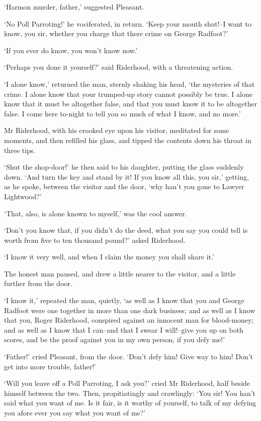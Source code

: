 ‘Harmon murder, father,’ suggested Pleasant.

‘No Poll Parroting!’ he vociferated, in return. ‘Keep your mouth
shut!--I want to know, you sir, whether you charge that there crime on
George Radfoot?’

‘If you ever do know, you won’t know now.’

‘Perhaps you done it yourself?’ said Riderhood, with a threatening
action.

‘I alone know,’ returned the man, sternly shaking his head, ‘the
mysteries of that crime. I alone know that your trumped-up story cannot
possibly be true. I alone know that it must be altogether false, and
that you must know it to be altogether false. I come here to-night to
tell you so much of what I know, and no more.’

Mr Riderhood, with his crooked eye upon his visitor, meditated for some
moments, and then refilled his glass, and tipped the contents down his
throat in three tips.

‘Shut the shop-door!’ he then said to his daughter, putting the glass
suddenly down. ‘And turn the key and stand by it! If you know all this,
you sir,’ getting, as he spoke, between the visitor and the door, ‘why
han’t you gone to Lawyer Lightwood?’

‘That, also, is alone known to myself,’ was the cool answer.

‘Don’t you know that, if you didn’t do the deed, what you say you could
tell is worth from five to ten thousand pound?’ asked Riderhood.

‘I know it very well, and when I claim the money you shall share it.’

The honest man paused, and drew a little nearer to the visitor, and a
little further from the door.

‘I know it,’ repeated the man, quietly, ‘as well as I know that you and
George Radfoot were one together in more than one dark business; and as
well as I know that you, Roger Riderhood, conspired against an innocent
man for blood-money; and as well as I know that I can--and that I swear
I will!--give you up on both scores, and be the proof against you in my
own person, if you defy me!’

‘Father!’ cried Pleasant, from the door. ‘Don’t defy him! Give way to
him! Don’t get into more trouble, father!’

‘Will you leave off a Poll Parroting, I ask you?’ cried Mr Riderhood,
half beside himself between the two. Then, propitiatingly and
crawlingly: ‘You sir! You han’t said what you want of me. Is it fair, is
it worthy of yourself, to talk of my defying you afore ever you say what
you want of me?’

